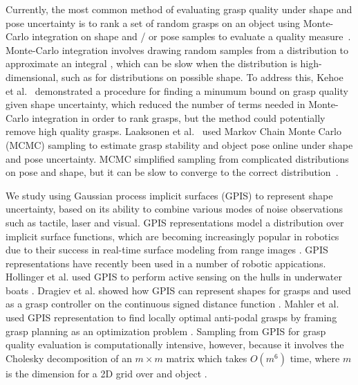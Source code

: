 \documentclass[letterpaper, 10 pt, conference]{ieeeconf}  %
\begin{document}
Currently, the most common method of evaluating grasp quality under shape and pose uncertainty is to rank a set of random grasps on an object using Monte-Carlo integration on shape and / or pose samples to evaluate a quality measure~\cite{christopoulos2007handling, kehoe2012estimating, kehoe2012toward}.
Monte-Carlo integration involves drawing random samples from a distribution to approximate an integral \cite{caflisch1998monte}, which can be slow when the distribution is high-dimensional, such as for distributions on possible shape.
To address this, Kehoe et al.~\cite{kehoe2012estimating, kehoe2012toward} demonstrated a procedure for finding a minumum bound on grasp quality given shape uncertainty, which reduced the number of terms needed in Monte-Carlo integration in order to rank grasps, but the method could potentially remove high quality grasps.
Laaksonen et al.~\cite{laaksonen2012probabilistic} used Markov Chain Monte Carlo (MCMC) sampling to estimate grasp stability and object pose online under shape and pose uncertainty.
MCMC simplified sampling from complicated distributions on pose and shape, but it can be slow to converge to the correct distribution~\cite{andrieu2003introduction}.

We study using Gaussian process implicit surfaces (GPIS) to represent shape uncertainty, based on its ability to combine various modes of noise observations such as tactile, laser and visual.
GPIS representations model a distribution over implicit surface functions, which are becoming increasingly popular in robotics due to their success in real-time surface modeling from range images \cite{curless1996volumetric, newcombe2011kinectfusion}.
GPIS representations have recently been used in a number of robotic appications.
Hollinger et al. used GPIS to perform active sensing on the hulls in underwater boats \cite{hollinger2013}.
Dragiev et al. showed how GPIS can represent shapes for grasps and used  as a grasp controller on the continuous signed distance function \cite{dragiev2011}.
Mahler et al. used GPIS representation to find locally optimal anti-podal grasps by framing grasp planning as an optimization problem \cite{jeff}. 
Sampling from GPIS for grasp quality evaluation is computationally intensive, however, because it involves the Cholesky decomposition of an $m \times m$ matrix which takes $O(m^6)$ time, where $m$ is the dimension for a 2D grid over and object \cite{morrison1990multivariate}.
\end{document}
